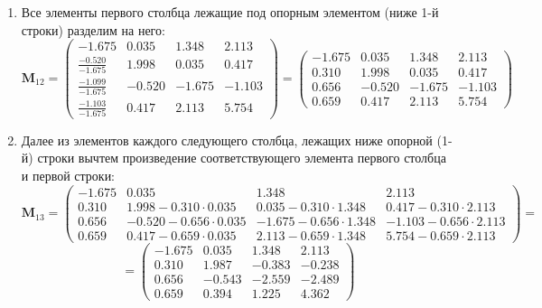 \begin{enumerate}
    \item Все элементы первого столбца лежащие под опорным элементом (ниже 1-й строки) разделим на него:
    \[\mathbf{M}_{12} =
    \begin{pmatrix}
        \mathbf{-1.675}& 0.035& 1.348& 2.113\\
        \frac{-0.520}{-1.675}&  1.998&  0.035&  0.417\\
        \frac{-1.099}{-1.675}& -0.520& -1.675& -1.103\\
        \frac{-1.103}{-1.675}&  0.417&  2.113&  5.754
    \end{pmatrix} =
    \begin{pmatrix}
        \mathbf{-1.675}& 0.035& 1.348& 2.113\\
        \mathit{0.310}&  1.998&  0.035&  0.417\\
        \mathit{0.656}& -0.520& -1.675& -1.103\\
        \mathit{0.659}&  0.417&  2.113&  5.754
    \end{pmatrix}\]

    \item Далее из элементов каждого следующего столбца, лежащих ниже опорной (1-й) строки вычтем произведение соответствующего элемента первого столбца и первой строки:
    \[\mathbf{M}_{13} = \begin{pmatrix}
               -1.675 &  \mathbf{0.035}&  \mathbf{1.348}& \mathbf{2.113}\\
        \mathbf{0.310}&  1.998-0.310\cdot0.035&  0.035-0.310\cdot1.348&  0.417-0.310\cdot2.113\\
        \mathbf{0.656}& -0.520-0.656\cdot0.035& -1.675-0.656\cdot1.348& -1.103-0.656\cdot2.113\\
        \mathbf{0.659}&  0.417-0.659\cdot0.035&  2.113-0.659\cdot1.348&  5.754-0.659\cdot2.113
    \end{pmatrix}=\]
    \[=\begin{pmatrix}
      -1.675&  0.035&  1.348&  2.113\\
       0.310&  1.987& -0.383& -0.238\\
       0.656& -0.543& -2.559& -2.489\\
       0.659&  0.394&  1.225&  4.362
    \end{pmatrix}\]


\end{enumerate}
